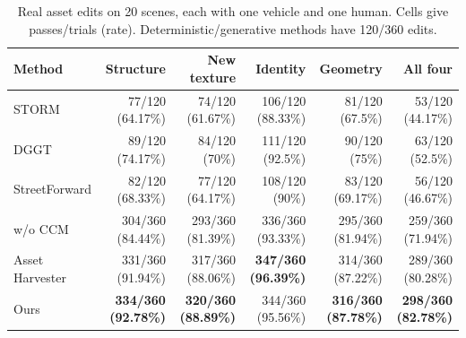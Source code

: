 \begin{table}[H]
\centering\small
\setlength{\tabcolsep}{3pt}
\caption{Real asset edits on 20 scenes, each with one vehicle and one human. Cells give passes/trials (rate). Deterministic/generative methods have 120/360 edits.}
\label{tab:real-edit-baselines}
\begin{tabular}{@{}lrrrrr@{}}
\toprule
Method & Structure & New texture & Identity & Geometry & All four \\
\midrule
STORM & 77/120 (64.17\%) & 74/120 (61.67\%) & 106/120 (88.33\%) & 81/120 (67.5\%) & 53/120 (44.17\%) \\
DGGT & 89/120 (74.17\%) & 84/120 (70\%) & 111/120 (92.5\%) & 90/120 (75\%) & 63/120 (52.5\%) \\
StreetForward & 82/120 (68.33\%) & 77/120 (64.17\%) & 108/120 (90\%) & 83/120 (69.17\%) & 56/120 (46.67\%) \\
w/o CCM & 304/360 (84.44\%) & 293/360 (81.39\%) & 336/360 (93.33\%) & 295/360 (81.94\%) & 259/360 (71.94\%) \\
Asset Harvester & 331/360 (91.94\%) & 317/360 (88.06\%) & \textbf{347/360 (96.39\%)} & 314/360 (87.22\%) & 289/360 (80.28\%) \\
Ours & \textbf{334/360 (92.78\%)} & \textbf{320/360 (88.89\%)} & 344/360 (95.56\%) & \textbf{316/360 (87.78\%)} & \textbf{298/360 (82.78\%)} \\
\bottomrule
\end{tabular}
\end{table}

